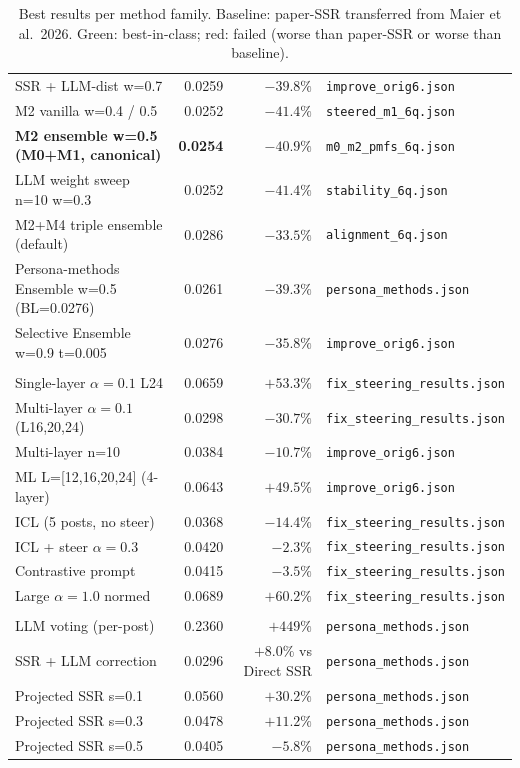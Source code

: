 \documentclass[10pt,a4paper]{article}
\newcommand{\bad}[1]{\textcolor{red!60!black}{#1}}
\begin{document}
\begin{table}[H]
\begin{tabular}{l r r l}
SSR + LLM-dist w=0.7 & 0.0259 & $-39.8\%$ & \texttt{improve\_orig6.json} \\
M2 vanilla w=0.4 / 0.5 & 0.0252 & $-41.4\%$ & \texttt{steered\_m1\_6q.json} \\
\rowcolor{bestrow}
\textbf{M2 ensemble w=0.5 (M0+M1, canonical)} & \textbf{0.0254} & $\mathbf{-40.9\%}$ & \texttt{m0\_m2\_pmfs\_6q.json} \\
LLM weight sweep n=10 w=0.3 & 0.0252 & $-41.4\%$ & \texttt{stability\_6q.json} \\
M2+M4 triple ensemble (default) & 0.0286 & $-33.5\%$ & \texttt{alignment\_6q.json} \\
Persona-methods Ensemble w=0.5 (BL=0.0276) & 0.0261 & $-39.3\%$ & \texttt{persona\_methods.json} \\
Selective Ensemble w=0.9 t=0.005 & 0.0276 & $-35.8\%$ & \texttt{improve\_orig6.json} \\
\midrule
\rowcolor{neutralrow}
\multicolumn{4}{l}{\emph{Activation-steering family (mostly negative)}} \\
Single-layer $\alpha{=}0.1$ L24 & \bad{0.0659} & $+53.3\%$ & \texttt{fix\_steering\_results.json} \\
Multi-layer $\alpha{=}0.1$ (L16,20,24) & 0.0298 & $-30.7\%$ & \texttt{fix\_steering\_results.json} \\
Multi-layer n=10 & 0.0384 & $-10.7\%$ & \texttt{improve\_orig6.json} \\
ML L=[12,16,20,24] (4-layer) & \bad{0.0643} & $+49.5\%$ & \texttt{improve\_orig6.json} \\
ICL (5 posts, no steer) & 0.0368 & $-14.4\%$ & \texttt{fix\_steering\_results.json} \\
ICL + steer $\alpha{=}0.3$ & 0.0420 & $-2.3\%$ & \texttt{fix\_steering\_results.json} \\
Contrastive prompt & 0.0415 & $-3.5\%$ & \texttt{fix\_steering\_results.json} \\
Large $\alpha{=}1.0$ normed & \bad{0.0689} & $+60.2\%$ & \texttt{fix\_steering\_results.json} \\
\midrule
\rowcolor{neutralrow}
\multicolumn{4}{l}{\emph{Failed methods (kept for transparency)}} \\
LLM voting (per-post) & \bad{0.2360} & $+449\%$ & \texttt{persona\_methods.json} \\
SSR + LLM correction & \bad{0.0296} & $+8.0\%$ vs Direct SSR & \texttt{persona\_methods.json} \\
Projected SSR s=0.1 & \bad{0.0560} & $+30.2\%$ & \texttt{persona\_methods.json} \\
Projected SSR s=0.3 & \bad{0.0478} & $+11.2\%$ & \texttt{persona\_methods.json} \\
Projected SSR s=0.5 & \bad{0.0405} & $-5.8\%$ & \texttt{persona\_methods.json} \\
\bottomrule
\end{tabular}
\caption{Best results per method family. Baseline: paper-SSR transferred from Maier et al.\ 2026. Green: best-in-class; red: failed (worse than paper-SSR or worse than baseline).}
\end{table}
\end{document}
